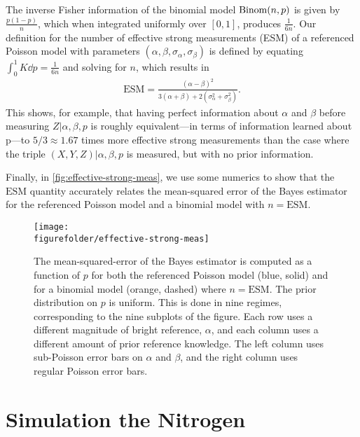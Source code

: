 \documentclass[aps,nofootinbib,twocolumn,superscriptaddress]{revtex4}
\newcommand{\figurefolder}{../fig}
\newcommand{\ESM}{\text{ESM}}
\begin{document}
The inverse Fisher information of the binomial model $\operatorname{Binom}(n,p)$
is given by $\frac{p(1-p)}{n}$, which when integrated uniformly over
$[0,1]$, produces $\frac{1}{6n}$.
Our definition for the number of effective strong measurements (ESM)
of a referenced Poisson model with parameters
$(\alpha,\beta,\sigma_\alpha,\sigma_\beta)$ is defined by
equating $\int_0^1 K\dd p=\frac{1}{6n}$ and solving for $n$,
which results in
\begin{align}
   \ESM = \frac{
            (\alpha-\beta)^2
        }{
            3(\alpha+\beta)+2\left(\sigma_\alpha^2+\sigma_\beta^2\right)
        }.
\end{align}
This shows, for example,
that having perfect information about $\alpha$ and $\beta$
before measuring $Z|\alpha,\beta,p$ is roughly equivalent---in terms
of information learned about p---to
$5/3\approx 1.67$ times more effective strong measurements
than the case where the triple $(X,Y,Z)|\alpha,\beta,p$ is
measured, but with no prior information.

Finally, in \autoref{fig:effective-strong-meas}, we use some numerics
to show that the $\ESM$
quantity accurately relates the mean-squared error of the Bayes estimator
for the referenced Poisson model and a binomial model with $n=\ESM$.

\begin{figure}
    \texttt{[image: \\figurefolder/effective-strong-meas]}
    \caption{The mean-squared-error of the Bayes estimator is computed
    as a function of $p$
    for both the referenced Poisson model (blue, solid) and for a binomial model
    (orange, dashed) where $n=\ESM$.
    The prior distribution on $p$ is uniform.
    This is done in nine regimes, corresponding to the nine subplots of the figure.
    Each row uses a different magnitude of bright reference, $\alpha$,
    and each column uses a different amount of prior reference knowledge.
    The left column uses sub-Poisson error bars on $\alpha$ and $\beta$,
    and the right column uses regular Poisson error bars.}
    \label{fig:effective-strong-meas}
\end{figure}

\section{Simulation the Nitrogen}
\label{apx:nitrogen-sim}
\end{document}
